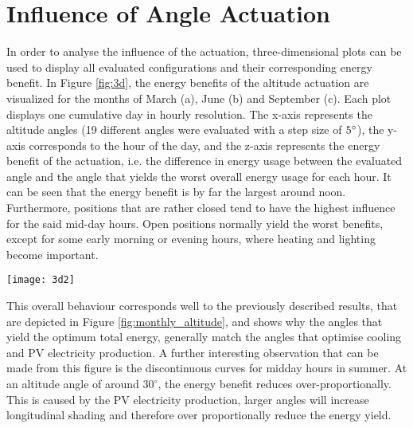 	


\section{Influence of Angle Actuation}
\label{s:actuation}
	In order to analyse the influence of the actuation, three-dimensional plots can be used to display all evaluated configurations and their corresponding energy benefit. In Figure \ref{fig:3d}, the energy benefits of the altitude actuation are visualized for the months of March (a), June (b) and September (c). Each plot displays one cumulative day in hourly resolution. The x-axis  represents the altitude angles (19 different angles were evaluated with a step size of $5\degree$), the y-axis corresponds to the hour of the day, and the z-axis represents the energy benefit of the actuation, i.e. the difference in energy usage between the evaluated angle and the angle that yields the worst overall energy usage for each hour. It can be seen that the energy benefit is by far the largest around noon. Furthermore, positions that are rather closed tend to have the highest influence for the said mid-day hours. Open positions normally yield the worst benefits, except for some early morning or evening hours, where heating and lighting become important. 


	\begin{figure*}[h!]
		\begin{center}
		\texttt{[image: 3d2]}
		\caption{Energy benefits of the altitude actuation for the months of March (a), June (b) and September (c). Each plot displays one cumulative day in hourly resolution. The x-axis  represents the altitude angles, the y-axis corresponds to the hour of the day, and the z-axis represents the energy benefit of the actuation, i.e. the difference in energy usage between the evaluated angle and the angle that yields the worst overall energy usage for each hour.}
		\label{fig:3d}
		\end{center}
	\end{figure*}

	This overall behaviour corresponds well to the previously described results, that are depicted in Figure \ref{fig:monthly_altitude}, and shows why the angles that yield the optimum total energy, generally match the angles that optimise cooling and PV electricity production. A further interesting observation that can be made from this figure is the discontinuous curves for midday hours in summer. At an altitude angle of around $30^{\circ}$, the energy benefit reduces over-proportionally. This is caused by the PV electricity production, larger angles will increase longitudinal shading and therefore over proportionally reduce the energy yield. 



